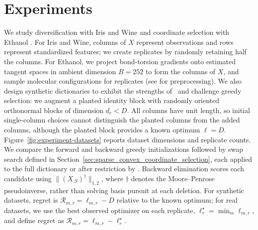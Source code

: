 \section{Experiments}
\label{sec:experiments}

We study diversification with Iris and Wine \citep{misc_iris_53, misc_wine_109, scikit-learn} and coordinate selection with Ethanol \citep{Chmiela2018-at, Koelle2022-ju}.
For Iris and Wine, columns of $X$ represent observations and rows represent standardized features; we create replicates by randomly retaining half the columns.
For Ethanol, we project bond-torsion gradients onto estimated tangent spaces in ambient dimension $B=252$ to form the columns of $X$, and sample molecular configurations for replicates (see \citet{Koelle2022-ju} for preprocessing).
We also design synthetic dictionaries to exhibit the strengths of \isometrypursuit~and challenge greedy selection: we augment a planted identity block with randomly oriented orthonormal blocks of dimension $d_c<D$.
All columns have unit length, so initial single-column choices cannot distinguish the planted columns from the added columns, although the planted block provides a known optimum $\ell=D$.
Figure~\ref{fig:experiment-datasets} reports dataset dimensions and replicate counts.
We compare the forward and backward greedy initializations followed by swap search defined in Section~\ref{sec:sparse_convex_coordinate_selection}, each applied to the full dictionary or after restriction by \isometrypursuit.
Backward elimination scores each candidate using $\|(X_{.S})^\dagger\|_{1,2}$, where $\dagger$ denotes the Moore--Penrose pseudoinverse, rather than solving basis pursuit at each deletion.
For synthetic datasets, regret is $\mathcal R_{m,r}=\ell_{m,r}-D$ relative to the known optimum; for real datasets, we use the best observed optimizer on each replicate, $\ell_r^\star=\min_m\ell_{m,r}$, and define regret as $\mathcal R_{m,r}=\ell_{m,r}-\ell_r^\star$.

